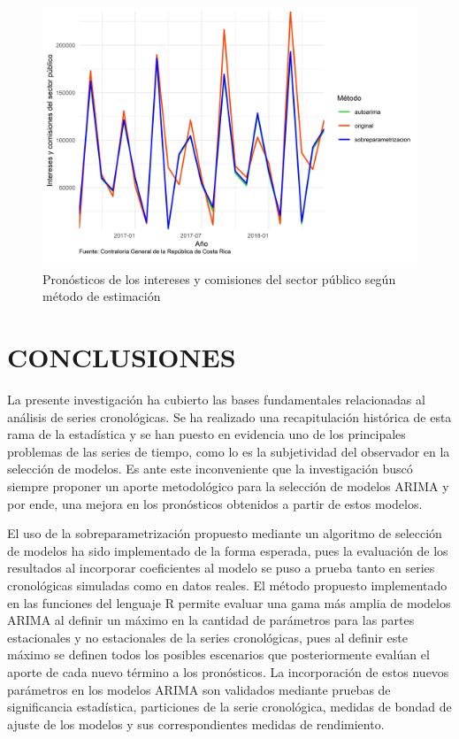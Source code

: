 \documentclass[
]{article}
\begin{document}
\begin{figure}[!h]
\includegraphics[width=1\linewidth,height=1\textheight]{Tesis_files/figure-latex/interesesplotpronostico-1} \caption{Pronósticos de los intereses y comisiones del sector público según método de estimación}\label{fig:interesesplotpronostico}
\end{figure}

\newpage

\section{CONCLUSIONES}

La presente investigación ha cubierto las bases fundamentales
relacionadas al análisis de series cronológicas. Se ha realizado una
recapitulación histórica de esta rama de la estadística y se han puesto
en evidencia uno de los principales problemas de las series de tiempo,
como lo es la subjetividad del observador en la selección de modelos. Es
ante este inconveniente que la investigación buscó siempre proponer un
aporte metodológico para la selección de modelos ARIMA y por ende, una
mejora en los pronósticos obtenidos a partir de estos modelos.

El uso de la sobreparametrización propuesto mediante un algoritmo de
selección de modelos ha sido implementado de la forma esperada, pues la
evaluación de los resultados al incorporar coeficientes al modelo se
puso a prueba tanto en series cronológicas simuladas como en datos
reales. El método propuesto implementado en las funciones del lenguaje R
permite evaluar una gama más amplia de modelos ARIMA al definir un
máximo en la cantidad de parámetros para las partes estacionales y no
estacionales de la series cronológicas, pues al definir este máximo se
definen todos los posibles escenarios que posteriormente evalúan el
aporte de cada nuevo término a los pronósticos. La incorporación de
estos nuevos parámetros en los modelos ARIMA son validados mediante
pruebas de significancia estadística, particiones de la serie
cronológica, medidas de bondad de ajuste de los modelos y sus
correspondientes medidas de rendimiento.
\end{document}
